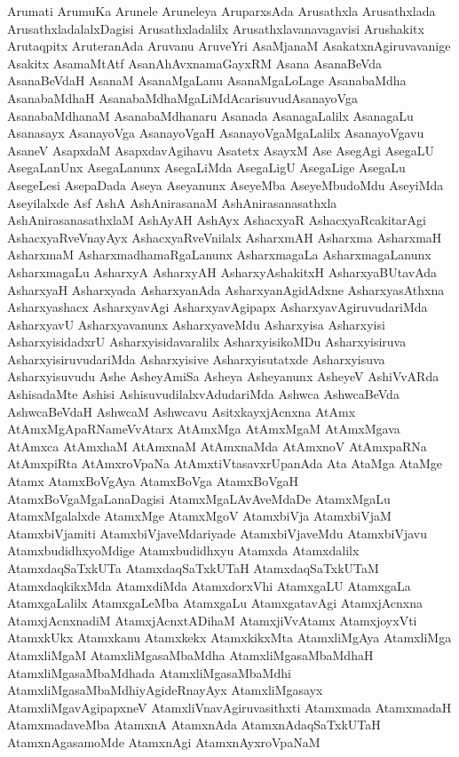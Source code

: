 {Arumati
ArumuKa
Arunele
Aruneleya
AruparxsAda
Arusathxla
Arusathxlada
ArusathxladalalxDagisi
Arusathxladalilx
Arusathxlavanavagavisi
Arushakitx
Arutaqpitx
AruteranAda
Aruvanu
AruveYri
AsaMjanaM
AsakatxnAgiruvavanige
Asakitx
AsamaMtAtf
AsanAhAvxnamaGayxRM
Asana
AsanaBeVda
AsanaBeVdaH
AsanaM
AsanaMgaLanu
AsanaMgaLoLage
AsanabaMdha
AsanabaMdhaH
AsanabaMdhaMgaLiMdAcarisuvudAsanayoVga
AsanabaMdhanaM
AsanabaMdhanaru
Asanada
AsanagaLalilx
AsanagaLu
Asanasayx
AsanayoVga
AsanayoVgaH
AsanayoVgaMgaLalilx
AsanayoVgavu
AsaneV
AsapxdaM
AsapxdavAgihavu
Asatetx
AsayxM
Ase
AsegAgi
AsegaLU
AsegaLanUnx
AsegaLanunx
AsegaLiMda
AsegaLigU
AsegaLige
AsegaLu
AsegeLesi
AsepaDada
Aseya
Aseyanunx
AseyeMba
AseyeMbudoMdu
AseyiMda
Aseyilalxde
Asf
AshA
AshAnirasanaM
AshAnirasanasathxla
AshAnirasanasathxlaM
AshAyAH
AshAyx
AshacxyaR
AshacxyaRcakitarAgi
AshacxyaRveVnayAyx
AshacxyaRveVnilalx
AsharxmAH
Asharxma
AsharxmaH
AsharxmaM
AsharxmadhamaRgaLanunx
AsharxmagaLa
AsharxmagaLanunx
AsharxmagaLu
AsharxyA
AsharxyAH
AsharxyAshakitxH
AsharxyaBUtavAda
AsharxyaH
Asharxyada
AsharxyanAda
AsharxyanAgidAdxne
AsharxyasAthxna
Asharxyashacx
AsharxyavAgi
AsharxyavAgipapx
AsharxyavAgiruvudariMda
AsharxyavU
Asharxyavanunx
AsharxyaveMdu
Asharxyisa
Asharxyisi
AsharxyisidadxrU
Asharxyisidavaralilx
AsharxyisikoMDu
Asharxyisiruva
AsharxyisiruvudariMda
Asharxyisive
Asharxyisutatxde
Asharxyisuva
Asharxyisuvudu
Ashe
AsheyAmiSa
Asheya
Asheyanunx
AsheyeV
AshiVvARda
AshisadaMte
Ashisi
AshisuvudilalxvAdudariMda
Ashwca
AshwcaBeVda
AshwcaBeVdaH
AshwcaM
Ashwcavu
AsitxkayxjAcnxna
AtAmx
AtAmxMgApaRNameVvAtarx
AtAmxMga
AtAmxMgaM
AtAmxMgava
AtAmxca
AtAmxhaM
AtAmxnaM
AtAmxnaMda
AtAmxnoV
AtAmxpaRNa
AtAmxpiRta
AtAmxroVpaNa
AtAmxtiVtasavxrUpanAda
Ata
AtaMga
AtaMge
Atamx
AtamxBoVgAya
AtamxBoVga
AtamxBoVgaH
AtamxBoVgaMgaLanaDagisi
AtamxMgaLAvAveMdaDe
AtamxMgaLu
AtamxMgalalxde
AtamxMge
AtamxMgoV
AtamxbiVja
AtamxbiVjaM
AtamxbiVjamiti
AtamxbiVjaveMdariyade
AtamxbiVjaveMdu
AtamxbiVjavu
AtamxbudidhxyoMdige
Atamxbudidhxyu
Atamxda
Atamxdalilx
AtamxdaqSaTxkUTa
AtamxdaqSaTxkUTaH
AtamxdaqSaTxkUTaM
AtamxdaqkikxMda
AtamxdiMda
AtamxdorxVhi
AtamxgaLU
AtamxgaLa
AtamxgaLalilx
AtamxgaLeMba
AtamxgaLu
AtamxgatavAgi
AtamxjAcnxna
AtamxjAcnxnadiM
AtamxjAcnxtADihaM
AtamxjiVvAtamx
AtamxjoyxVti
AtamxkUkx
Atamxkanu
Atamxkekx
AtamxkikxMta
AtamxliMgAya
AtamxliMga
AtamxliMgaM
AtamxliMgasaMbaMdha
AtamxliMgasaMbaMdhaH
AtamxliMgasaMbaMdhada
AtamxliMgasaMbaMdhi
AtamxliMgasaMbaMdhiyAgideRnayAyx
AtamxliMgasayx
AtamxliMgavAgipapxneV
AtamxliVnavAgiruvasithxti
Atamxmada
AtamxmadaH
AtamxmadaveMba
AtamxnA
AtamxnAda
AtamxnAdaqSaTxkUTaH
AtamxnAgasamoMde
AtamxnAgi
AtamxnAyxroVpaNaM
}
